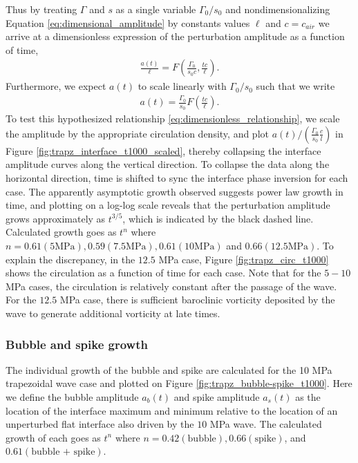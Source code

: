 \documentclass{jfm}%
\begin{document}
Thus by treating $\Gamma$ and $s$ as a single variable $\Gamma_0/s_0$
and nondimensionalizing Equation \eqref{eq:dimensional_amplitude} by
constants values $\ell$ and $c=c_{air}$ we arrive at a dimensionless
expression of the perturbation amplitude as a function of time,
%
\begin{align}
  \label{eq:dimensionless_groups}
  \frac{a(t)}{\ell}=F\left(\frac{\Gamma_0}{s_0 c}, \frac{t c}{\ell} \right).
\end{align}
%
Furthermore, we expect $a(t)$ to scale linearly with $\Gamma_0/s_0$
such that we write
%
\begin{align}
  \label{eq:dimensionless_relationship}
  a(t)=\frac{\Gamma_0}{s_0}F\left(\frac{t c}{\ell} \right).
\end{align}
%
To test this hypothesized relationship
\eqref{eq:dimensionless_relationship}, we scale the amplitude by the
appropriate circulation density, and plot
$a(t)/\left(\frac{\Gamma_0}{s_0}\frac{c}{l}\right)$ in Figure
\ref{fig:trapz_interface_t1000_scaled}, thereby collapsing the
interface amplitude curves along the vertical direction. To collapse
the data along the horizontal direction, time is shifted to sync the
interface phase inversion for each case. The apparently asymptotic
growth observed suggests power law growth in time, and plotting on a
log-log scale reveals that the perturbation amplitude grows
approximately as $t^{3/5}$, which is indicated by the black dashed
line. Calculated growth goes as $t^n$ where
$n=0.61 (5 \text{MPa}), 0.59 (7.5 \text{MPa}), 0.61 (10 \text{MPa})$
and $0.66 (12.5 \text{MPa})$. To explain the discrepancy, in the $12.5$
MPa case, Figure \ref{fig:trapz_circ_t1000} shows the circulation as a function of time for each
case. Note that for the $5-10$ MPa cases, the circulation is
relatively constant after the passage of the wave. For the $12.5$ MPa
case, there is sufficient baroclinic vorticity deposited by the wave
to generate additional vorticity at late times.

\subsubsection{Bubble and spike growth}
The individual growth of the bubble and spike are calculated for the
10 MPa trapezoidal wave case and plotted on Figure
\ref{fig:trapz_bubble-spike_t1000}. Here we define the bubble
amplitude $a_b(t)$ and spike amplitude $a_s(t)$ as the location of the
interface maximum and minimum relative to the location of an
unperturbed flat interface also driven by the $10$ MPa wave. The
calculated growth of each goes as $t^n$ where
$n=0.42 ( \text{bubble} ), 0.66 ( \text{spike} )$, and
$0.61 ( \text{bubble + spike} )$.
\end{document}
